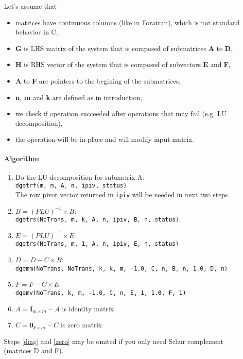 \documentclass[12pt]{article}
\begin{document}
Let's assume that
\begin{itemize}
    \item matrices have continuous columns (like in Foratran), which is not standard behavior in C,
    \item \textbf{G} is LHS matrix of the system that is composed of submatrices \textbf{A} to \textbf{D},
    \item \textbf{H} is RHS vector of the system that is composed of subvectors \textbf{E} and \textbf{F},
    \item \textbf{A} to \textbf{F} are pointers to the begining of the submatrices,
    \item \textbf{n}, \textbf{m} and \textbf{k} are defined as in introduction,
    \item we check if operation succeeded after operations that may fail (e.g. LU decomposition),
    \item the operation will be in-place and will modify input matrix.
\end{itemize}

\paragraph{Algorithm}
\begin{enumerate}
    \item Do the LU decomposition for submatrix A: \\ \texttt{dgetrf(m, m, A, n, ipiv, status)} \\ The row pivot vector returned in \texttt{ipiv} will be needed in next two steps.
    \item $B = (PLU)^{-1} \times B$: \\ \texttt{dgetrs(NoTrans, m, k, A, n, ipiv, B, n, status)}
    \item $E = (PLU)^{-1} \times E$: \\ \texttt{dgetrs(NoTrans, m, 1, A, n, ipiv, E, n, status)}
    \item $D = D - C \times B$: \\ \texttt{dgemm(NoTrans, NoTrans, k, k, m, -1.0, C, n, B, n, 1.0, D, n)}
    \item $F = F - C \times E$: \\ \texttt{dgemv(NoTrans, k, m, -1.0, C, n, E, 1, 1.0, F, 1)}
    \item\label{diag} $A = \boldsymbol{I}_{m × m}$ – $A$ is identity matrix
    \item\label{zero} $C = \boldsymbol{0}_{k × m}$ – $C$ is zero matrix
\end{enumerate}

Steps \ref{diag} and \ref{zero} may be omited if you only need Schur complement (matrices D and F).
\end{document}
